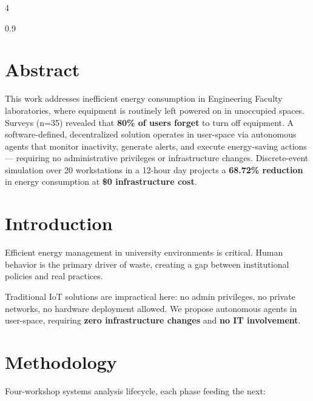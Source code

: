 \documentclass[a0,landscape]{a0poster}
\begin{document}
\begin{multicols}{4}
\begin{spacing}{0.9}


\section*{Abstract}
{\large This work addresses inefficient energy consumption in Engineering Faculty laboratories, where equipment is routinely left powered on in unoccupied spaces. Surveys (n=35) revealed that \textbf{80\% of users forget} to turn off equipment. A software-defined, decentralized solution operates in user-space via autonomous agents that monitor inactivity, generate alerts, and execute energy-saving actions — requiring no administrative privileges or infrastructure changes. Discrete-event simulation over 20 workstations in a 12-hour day projects a \textbf{68.72\% reduction} in energy consumption at \textbf{\$0 infrastructure cost}.}

\section*{Introduction}
{\large Efficient energy management in university environments is critical. Human behavior is the primary driver of waste, creating a gap between institutional policies and real practices.

Traditional IoT solutions are impractical here: no admin privileges, no private networks, no hardware deployment allowed. We propose autonomous agents in user-space, requiring \textbf{zero infrastructure changes} and \textbf{no IT involvement}.}

\section*{Methodology}
{\large Four-workshop systems analysis lifecycle, each phase feeding the next:}


\end{spacing}
\end{multicols}
\end{document}
